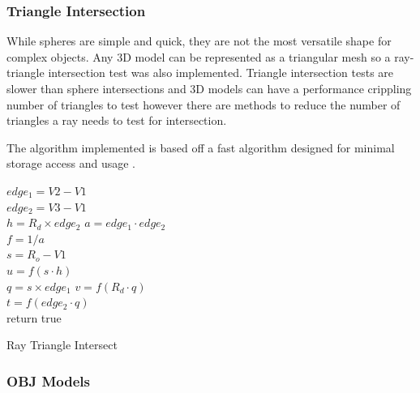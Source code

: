 \documentclass[final]{cmpreport}
\begin{document}
\subsubsection{Triangle Intersection}

While spheres are simple and quick, they are not the most versatile shape for complex objects. Any 3D model can be represented as a triangular mesh so a ray-triangle intersection test was also implemented. Triangle intersection tests are slower than sphere intersections and 3D models can have a performance crippling number of triangles to test however there are methods to reduce the number of triangles a ray needs to test for intersection.

The algorithm implemented is based off a fast algorithm designed for minimal storage access and usage \citep{moller1997fast}.

\begin{algorithm}[H]
    \SetAlgoLined
    $edge_1 = V2 - V1$ \\
    $edge_2 = V3 - V1$ \\
    $h = R_d \times edge_2$ 
    $a = edge_1 \cdot edge_2$ \\
    $f = 1 / a$ \\
    $s = R_o - V1$ \\
    $u = f(s \cdot h)$ \\
    $q = s \times edge_1$ 
    $v = f(R_d \cdot q)$ \\
    $t = f(edge_2 \cdot q)$ \\
    return true

    \caption{Ray Triangle Intersect}
\end{algorithm}

\subsubsection{OBJ Models}
\end{document}
